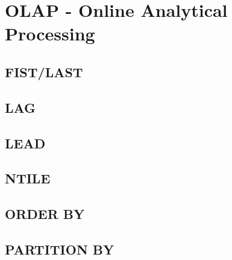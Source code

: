 \section[OLAP]{OLAP - Online Analytical Processing}
\label{sec:olap}

\subsection{FIST/LAST}
\label{sec:olap.first_last}

\subsection{LAG}
\label{sec:olap.lag}

\subsection{LEAD}
\label{sec:olap.lead}

\subsection{NTILE}
\label{sec:olap.ntile}

\subsection{ORDER BY}
\label{sec:olap.order_by}

\subsection{PARTITION BY}
\label{sec:olap.partition_by}

